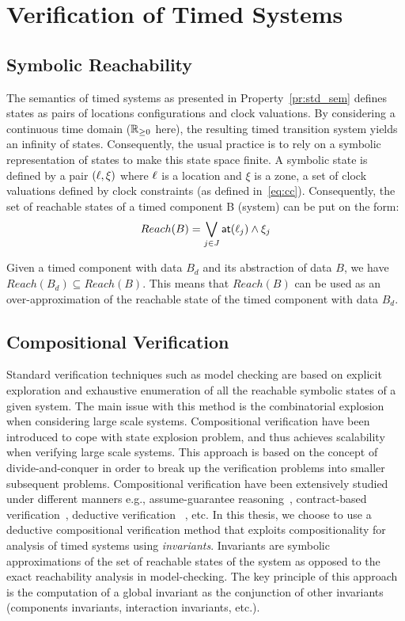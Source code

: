\section{Verification of Timed Systems}\label{sec:2.4}
\subsection{Symbolic Reachability}

The semantics of timed systems as presented in Property~\ref{pr:std_sem} 
defines states as pairs of locations configurations and clock
valuations. By considering a continuous time domain ($\mathbb{R}_{\ge 0}$ here), the 
resulting timed transition system yields an infinity of states.
Consequently, the usual practice is to rely on a symbolic representation
of states to make this state space finite.
A symbolic state is defined by a pair $(\ell,\xi)$ where $\ell$ is a location
and $\xi$ is a zone, a set of clock valuations defined by clock constraints
(as defined in~\ref{eq:cc}). Consequently, the set of reachable states of a 
timed component B (system) can be put on the form:
\begin{displaymath}
  Reach(B)=\bigvee_{j\in{J}}\textsf{at}(\ell_j)\wedge\xi_j
\end{displaymath}

Given a timed component with data $B_d$ and its abstraction of data $B$, we have
$Reach(B_d)\subseteq Reach(B)$. This means that $Reach(B)$ can be used as an over-approximation
of the reachable state of the timed component with data $B_d$.
\subsection{Compositional Verification}

Standard verification techniques such as model checking are based on explicit 
exploration and exhaustive enumeration of all the reachable symbolic states 
of a given system. The main issue with this 
method is the combinatorial explosion when considering large scale systems.
Compositional verification have been introduced to cope with state explosion
problem, and thus achieves scalability when verifying large scale systems.
This approach is based on the concept of divide-and-conquer in order to 
break up the verification
problems into smaller subsequent problems. Compositional verification have been 
extensively studied under different manners e.g., assume-guarantee 
reasoning~\cite{Lamport77,Owl76}, 
contract-based verification~\cite{contract1,contract2},  
deductive verification
~\cite{deductive}, etc.  
In this thesis, we choose to use a deductive compositional verification 
method that exploits compositionality for analysis of timed systems 
using \emph{invariants}. Invariants are symbolic approximations of the set 
of reachable states of the system as opposed to the exact 
reachability analysis in model-checking. The key principle of this 
approach is the computation of a global invariant as the conjunction of
other invariants (components invariants, interaction invariants, etc.).



